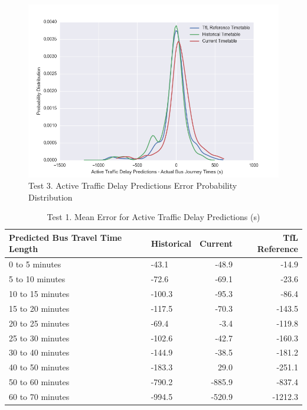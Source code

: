 \begin{figure}
\centering
\includegraphics[width=\textwidth]{figures/prediction_accuracy_23.png}
\caption{\label{fig:prediction_accuracy_23} Test 3. Active Traffic Delay Predictions Error Probability Distribution}
\end{figure}

\begin{table}
\centering
\begin{tabular}{@{}llrr@{}} \toprule
 Predicted Bus Travel Time Length & Historical & Current & TfL Reference \\  \midrule
0 to 5 minutes   &   -43.1    &  -48.9  &     -14.9     \\
5 to 10 minutes  &   -72.6    &  -69.1  &     -23.6     \\
10 to 15 minutes &   -100.3   &  -95.3  &     -86.4     \\
15 to 20 minutes &   -117.5   &  -70.3  &     -143.5    \\
20 to 25 minutes &   -69.4    &   -3.4  &     -119.8    \\
25 to 30 minutes &   -102.6   &  -42.7  &     -160.3    \\
30 to 40 minutes &   -144.9   &  -38.5  &     -181.2    \\
40 to 50 minutes &   -183.3   &   29.0  &     -251.1    \\
50 to 60 minutes &   -790.2   &  -885.9 &     -837.4    \\
60 to 70 minutes &   -994.5   &  -520.9 &    -1212.3    \\
\bottomrule
\end{tabular}
\caption{Test 1. Mean Error for Active Traffic Delay Predictions (s)}
\label{table:test1_mean_error}
\end{table}


